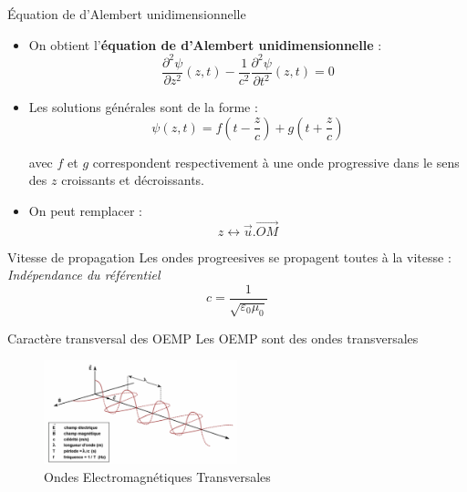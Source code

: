 \begin{Prop}{Équation de d'Alembert unidimensionnelle}{}
\begin{itemize}
    \item On obtient l'\textbf{équation de d'Alembert unidimensionnelle} :
\[
\frac{\partial ^{2}\psi}{\partial z^{2}} (z,t) - \frac{1}{c^{2}} \frac{\partial ^{2}\psi}{\partial t^{2}} (z,t) = 0
\]
\item Les solutions générales sont de la forme :
\[
\psi(z,t) = f\left( t- \frac{z}{c}  \right)  + g\left( t + \frac{z}{c}  \right) 
\]

avec $f$ et $g$ correspondent respectivement à une onde progressive dans le sens des $z$ croissants et décroissants.

\item On peut remplacer :
  \[
    z \longleftrightarrow \overrightarrow{u}. \overrightarrow{OM}
  \]
    
\end{itemize}
\end{Prop}

\begin{Prop}{Vitesse de propagation}{}
Les ondes progreesives se propagent toutes à la vitesse : \textit{Indépendance du référentiel}
    \[
    c = \frac{1}{\sqrt{\varepsilon_0 \mu_0} } 
    \]
\end{Prop}



\begin{Prop}{Caractère transversal des OEMP}{}
    \center
    Les OEMP sont des ondes transversales
    \begin{figure}[H] %
      \centering
      \includegraphics[width=0.5\textwidth]{./assets/Ondes Electromagnétiques Transversales.png}
      \caption{Ondes Electromagnétiques Transversales}
      \label{fig:${Ondes Electromagnétiques Transversales}}
    \end{figure}

            
        
\end{Prop}

